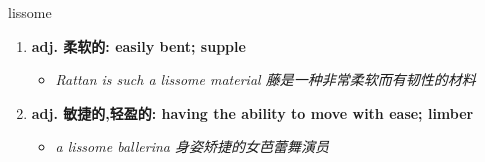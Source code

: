 
\begin{frame}
{\huge lissome}
\begin{center}
\begin{enumerate}\Large
  \item \textbf{adj. 柔软的: easily bent; supple}
  \begin{itemize}
    \item \em{\Large{Rattan is such a lissome material 藤是一种非常柔软而有韧性的材料}}
  \end{itemize}
  \item \textbf{adj. 敏捷的,轻盈的: having the ability to move with ease; limber}
  \begin{itemize}
    \item \em{\Large{a lissome ballerina 身姿矫捷的女芭蕾舞演员}}
  \end{itemize}
\end{enumerate}
\end{center}
\end{frame}
